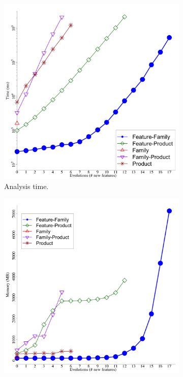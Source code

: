 \begin{figure}[p]
  \begin{subfigure}[t]{0.5\columnwidth}
    \centering
    \includegraphics[width=1.0\columnwidth]{img/logbsnTime}
    \caption{Analysis time.}
    \label{fig:bsn-analysisTime}
  \end{subfigure}
  \begin{subfigure}[t]{0.5\columnwidth}
    \centering
    \includegraphics[width=1.0\columnwidth]{img/bsnSpace}

\end{subfigure}
\end{figure}
